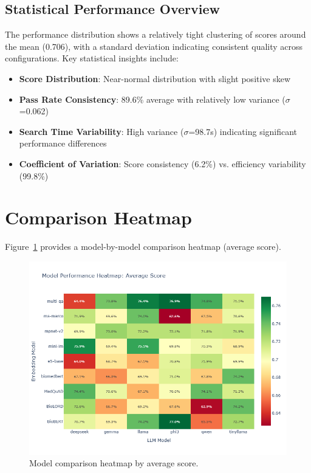 \subsection{Statistical Performance Overview}


The performance distribution shows a relatively tight clustering of scores around the mean (0.706), with a standard deviation indicating consistent quality across configurations. Key statistical insights include:

\begin{itemize}
    \item \textbf{Score Distribution}: Near-normal distribution with slight positive skew
    \item \textbf{Pass Rate Consistency}: 89.6\% average with relatively low variance ($\sigma$=0.062)
    \item \textbf{Search Time Variability}: High variance ($\sigma$=98.7s) indicating significant performance differences
    \item \textbf{Coefficient of Variation}: Score consistency (6.2\%) vs. efficiency variability (99.8\%)
\end{itemize}

\section{Comparison Heatmap}
Figure~\ref{fig:heatmap_avg_score} provides a model-by-model comparison heatmap (average score).

\begin{figure}[!htbp]
  \centering
  \includegraphics[width=\textwidth]{chap4_results/images/heatmap_average_score.png}
  \caption{Model comparison heatmap by average score.}
  \label{fig:heatmap_avg_score}
\end{figure}

